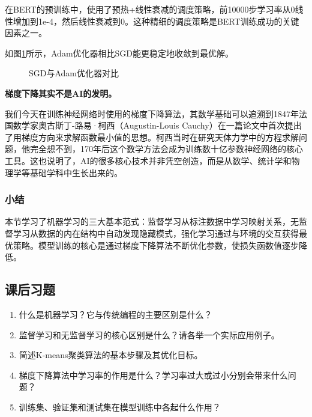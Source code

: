 在BERT的预训练中，使用了预热+线性衰减的调度策略，前10000步学习率从0线性增加到1e-4，然后线性衰减到0。这种精细的调度策略是BERT训练成功的关键因素之一。

如图\ref{fig:ch2_2_7}所示，Adam优化器相比SGD能更稳定地收敛到最优解。

\begin{figure}[htbp]
\centering
{}
\caption{SGD与Adam优化器对比}
\label{fig:ch2_2_7}
\end{figure}

\begin{knowledgebox}
\small
\textbf{梯度下降其实不是AI的发明。}

 我们今天在训练神经网络时使用的梯度下降算法，其数学基础可以追溯到1847年法国数学家奥古斯丁-路易·柯西（Augustin-Louis Cauchy）在一篇论文中首次提出了用梯度方向来求解函数最小值的思想。柯西当时在研究天体力学中的方程求解问题，他完全想不到，170年后这个数学方法会成为训练数十亿参数神经网络的核心工具。这也说明了，AI的很多核心技术并非凭空创造，而是从数学、统计学和物理学等基础学科中生长出来的。
\end{knowledgebox}




\subsubsection*{小结}

本节学习了机器学习的三大基本范式：监督学习从标注数据中学习映射关系，无监督学习从数据的内在结构中自动发现隐藏模式，强化学习通过与环境的交互获得最优策略。模型训练的核心是通过梯度下降算法不断优化参数，使损失函数值逐步降低。

\bigskip
\subsection*{课后习题}

\begin{enumerate}
\setlength{\itemsep}{6pt}
\item 什么是机器学习？它与传统编程的主要区别是什么？
\item 监督学习和无监督学习的核心区别是什么？请各举一个实际应用例子。
\item 简述K-means聚类算法的基本步骤及其优化目标。
\item 梯度下降算法中学习率的作用是什么？学习率过大或过小分别会带来什么问题？
\item 训练集、验证集和测试集在模型训练中各起什么作用？
\end{enumerate}

